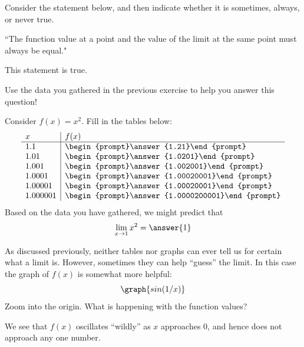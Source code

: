 \documentclass[handout]{ximera}
\begin{document}
\begin{exercise}

Consider the statement below, and then indicate whether it is sometimes, always, or never true.

``The function value at a point and the value of the limit at the same point must always be equal."

This statement is  true.

\begin{hint}

Use the data you gathered in the previous exercise to help you answer this question!  

\end{hint}

\end{exercise}

\begin{exercise}
Consider $f(x) = x^2$. Fill in the 
  tables below:
  \[
  \begin{array}{l|l}
    x      & f(x)      \\ \hline
    1.1    & \begin{prompt}\answer{1.21}\end{prompt}\\
    1.01   & \begin{prompt}\answer{1.0201}\end{prompt}\\
    1.001  & \begin{prompt}\answer{1.002001}\end{prompt}\\
    1.0001 & \begin{prompt}\answer{1.00020001}\end{prompt}\\
    1.00001 & \begin{prompt}\answer{1.00020001}\end{prompt}\\
    1.000001 & \begin{prompt}\answer{1.0000200001}\end{prompt}
  \end{array}
  \]
  Based on the data you have gathered, we might predict that 
  \[
  \lim_{x\to 1} x^2 = \answer{1}
  \]
  
    \begin{feedback}
    As discussed previously, neither tables nor graphs can ever tell us for certain what a limit is. However, sometimes they can help ``guess'' the limit. In this case the graph of $f(x)$ is somewhat more helpful:
\[
\graph{sin(1/x)}
\]
  Zoom into the origin. What is happening with the function values? 
  
  We see that $f(x)$ oscillates ``wildly'' as $x$ approaches $0$, and hence does not approach any one number.
  \end{feedback}

\end{exercise}
\end{document}
